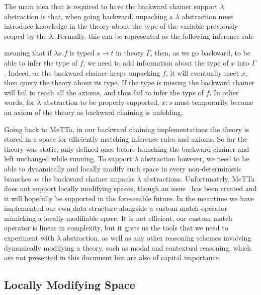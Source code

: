 \documentclass[]{report}
\begin{document}
The main idea that is required to have the backward chainer support
$\lambda$ abstraction is that, when going backward, unpacking a
$\lambda$ abstraction must introduce knowledge in the theory about the
type of the variable previously scoped by the $\lambda$.  Formally,
this can be represented as the following inference rule
\begin{prooftree}
\end{prooftree}
meaning that if $\lambda x.f$ is typed $s \to t$ in theory $\Gamma$,
then, as we go backward, to be able to infer the type of $f$, we need
to add information about the type of $x$ into $\Gamma$.  Indeed, as
the backward chainer keeps unpacking $f$, it will eventually meet $x$,
then query the theory about its type.  If the type is missing the
backward chainer will fail to reach all the axioms, and thus fail to
infer the type of $f$.  In other words, for $\lambda$ abstraction to
be properly supported, $x: s$ must temporarily become an axiom of the
theory as backward chaining is unfolding.

Going back to MeTTa, in our backward chaining implementations the
theory is stored in a space for efficiently matching inference rules
and axioms.  So far the theory was static, only defined once before
launching the backward chainer and left unchanged while running.  To
support $\lambda$ abstraction however, we need to be able to
dynamically and locally modify such space in every non-deterministic
branches as the backward chainer unpacks $\lambda$ abstractions.
Unfortunately, MeTTa does not support locally modifying spaces, though
an issue~\cite{ForkSpaceIssue} has been created and it will hopefully
be supported in the foreseeable future.  In the meantime we have
implemented our own data structure alongside a custom match operator
mimicking a locally modifiable space.  It is not efficient, our custom
match operator is linear in complexity, but it gives us the tools that
we need to experiment with $\lambda$ abstraction, as well as any other
reasoning schemes involving dynamically modifying a theory, such as
modal and contextual reasoning, which are not presented in this
document but are also of capital importance.

\subsection{Locally Modifying Space}
\end{document}
